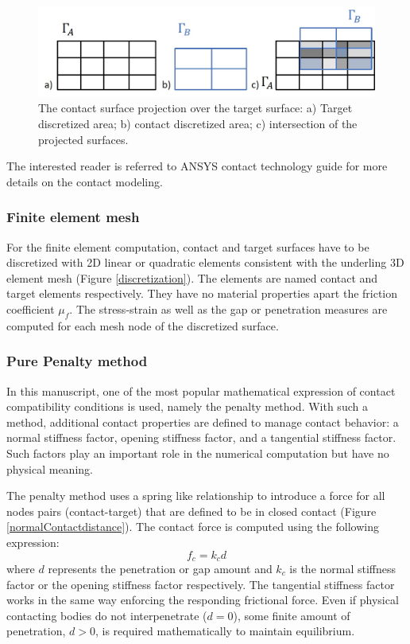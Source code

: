  \begin{center}
\begin{figure}
\centerline{\includegraphics[width=1\textwidth,keepaspectratio]{figures/projecte_surface.jpg} }
\caption{The contact surface projection over the target surface: a) Target discretized area; b) contact discretized area; c) intersection of the projected surfaces.}
\label{projecte_surface}
\end{figure}
\end{center}

 The interested reader is referred to ANSYS contact technology guide for more details on the contact modeling.


\subsubsection*{Finite element mesh}
For the finite element computation, contact and target surfaces have to be discretized with 2D linear or quadratic elements consistent with the underling 3D element mesh (Figure \ref{discretization}). The elements are named contact and target elements respectively.  They have no material properties apart the friction coefficient $\mu_f$. The stress-strain as well as the gap or penetration measures are computed for each mesh node of the discretized surface.

\subsubsection*{Pure Penalty method}
In this manuscript, one of the most popular mathematical expression of contact compatibility conditions is used, namely the penalty method. With such a method, additional contact properties are defined to manage contact behavior: a normal stiffness factor, opening stiffness factor, and a tangential stiffness factor. Such factors play an important role in the numerical computation but have no physical meaning.

The penalty method uses a spring like relationship to introduce a force for all nodes pairs (contact-target) that are defined to be in closed contact (Figure \ref{normalContactdistance}). The contact force is computed using the following expression:
\begin{equation}
f_c = k_c d
\end{equation}
where $d$ represents the penetration or gap amount and $k_c$ is the normal stiffness factor or the opening stiffness factor respectively. The tangential stiffness factor works in the same way enforcing the responding frictional force. Even if physical contacting bodies do not interpenetrate ($d = 0$), some finite amount of penetration, $d > 0$, is required mathematically to maintain equilibrium. 
 

